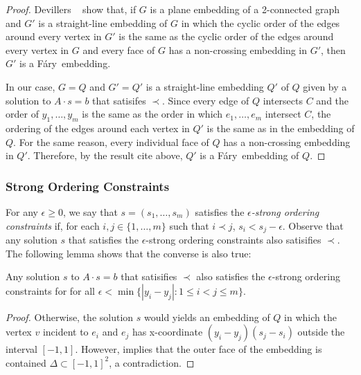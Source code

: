 \documentclass{patmorin}
\newcommand{\Fary}{Fáry}
\begin{document}
\begin{proof}
   Devillers \etal\ \cite[Lemma~16]{devillers.liotta.ea:checking} show
   that, if $G$ is a plane embedding of a 2-connected graph and $G'$
   is a straight-line embedding of $G$ in which the cyclic order of the
   edges around every vertex in $G'$ is the same as the cyclic order
   of the edges around every vertex in $G$ and every face of $G$
   has a non-crossing embedding in $G'$, then $G'$ is a \Fary\ embedding.

   In our case, $G=Q$ and $G'=Q'$ is a straight-line embedding $Q'$ of $Q$
   given by a solution to $A\cdot s = b$ that satisifes $\prec$.  Since
   every edge of $Q$ intersects $C$ and the order of $y_1,\ldots,y_m$
   is the same as the order in which $e_1,\ldots,e_m$ intersect $C$, the
   ordering of the edges around each vertex in $Q'$ is the same as in the
   embedding of $Q$.  For the same reason, every individual face of $Q$
   has a non-crossing embedding in $Q'$.  Therefore, by the result cite
   above, $Q'$ is a \Fary\ embedding of $Q$.
\end{proof}


\subsubsection{Strong Ordering Constraints}

For any $\epsilon \ge 0$, we say that $s=(s_1,\ldots,s_m)$ satisfies
the \emph{$\epsilon$-strong ordering constraints} if, for each
$i,j\in\{1,\ldots,m\}$ such that $i\prec j$, $s_i < s_j - \epsilon$.
Observe that any solution $s$ that satisfies the $\epsilon$-strong
ordering constraints also satisifies $\prec$. The following lemma shows
that the converse is also true:

\begin{lem}
   Any solution $s$ to $A\cdot s=b$ that satisifies $\prec$ also satisfies 
   the $\epsilon$-strong ordering constraints for
   for all $\epsilon<\min\{|y_i-y_j| : 1\le i< j\le m\}$.
\end{lem}

\begin{proof}
   Otherwise, the solution $s$ would yields an embedding of $Q$ in
   which the vertex $v$ incident to $e_i$ and $e_j$ has x-coordinate
   $(y_i-y_j)(s_j-s_i)$ outside the interval $[-1,1]$. However,
    implies that the outer face of the
   embedding is contained $\Delta\subset[-1,1]^2$, a contradiction.
\end{proof}
\end{document}

